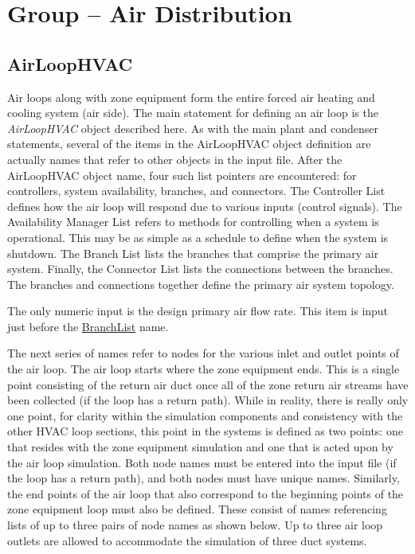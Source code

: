 \section{Group -- Air Distribution}\label{group-air-distribution}

\subsection{AirLoopHVAC}\label{airloophvac}

Air loops along with zone equipment form the entire forced air heating and cooling system (air side). The main statement for defining an air loop is the \emph{AirLoopHVAC} object described here. As with the main plant and condenser statements, several of the items in the AirLoopHVAC object definition are actually names that refer to other objects in the input file. After the AirLoopHVAC object name, four such list pointers are encountered: for controllers, system availability, branches, and connectors. The Controller List defines how the air loop will respond due to various inputs (control signals). The Availability Manager List refers to methods for controlling when a system is operational. This may be as simple as a schedule to define when the system is shutdown. The Branch List lists the branches that comprise the primary air system. Finally, the Connector List lists the connections between the branches. The branches and connections together define the primary air system topology.

The only numeric input is the design primary air flow rate. This item is input just before the \hyperref[branchlist]{BranchList} name.

The next series of names refer to nodes for the various inlet and outlet points of the air loop. The air loop starts where the zone equipment ends. This is a single point consisting of the return air duct once all of the zone return air streams have been collected (if the loop has a return path). While in reality, there is really only one point, for clarity within the simulation components and consistency with the other HVAC loop sections, this point in the systems is defined as two points: one that resides with the zone equipment simulation and one that is acted upon by the air loop simulation. Both node names must be entered into the input file (if the loop has a return path), and both nodes must have unique names. Similarly, the end points of the air loop that also correspond to the beginning points of the zone equipment loop must also be defined. These consist of names referencing lists of up to three pairs of node names as shown below. Up to three air loop outlets are allowed to accommodate the simulation of three duct systems.

